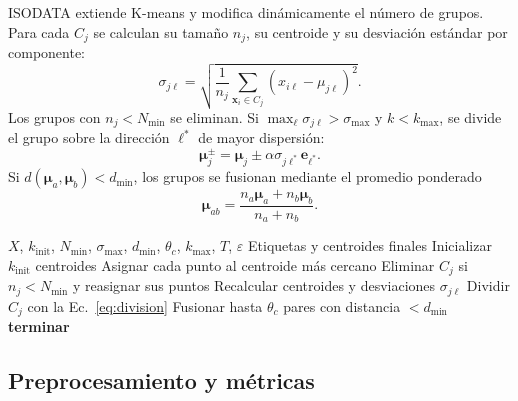 \documentclass[10pt,twocolumn]{article}
\begin{document}
ISODATA extiende K-means y modifica dinámicamente el número de grupos. Para
cada $C_j$ se calculan su tamaño $n_j$, su centroide y su desviación estándar
por componente:
\begin{equation}
 \sigma_{j\ell}=\sqrt{\frac{1}{n_j}
 \sum_{\bm{x}_i\in C_j}(x_{i\ell}-\mu_{j\ell})^2}.
 \label{eq:sigma}
\end{equation}
Los grupos con $n_j<N_{\min}$ se eliminan. Si
$\max_\ell\sigma_{j\ell}>\sigma_{\max}$ y $k<k_{\max}$, se divide el grupo
sobre la dirección $\ell^*$ de mayor dispersión:
\begin{equation}
 \bm{\mu}_{j}^{\pm}=\bm{\mu}_j
 \pm \alpha\sigma_{j\ell^*}\bm{e}_{\ell^*}.
 \label{eq:division}
\end{equation}
Si $d(\bm{\mu}_a,\bm{\mu}_b)<d_{\min}$, los grupos se fusionan mediante el
promedio ponderado
\begin{equation}
 \bm{\mu}_{ab}=\frac{n_a\bm{\mu}_a+n_b\bm{\mu}_b}{n_a+n_b}.
 \label{eq:fusion}
\end{equation}

\begin{algorithm}[H]
\small
\caption{ISODATA}
\label{alg:isodata}
\begin{algorithmic}[1]
\Require $X$, $k_{\mathrm{init}}$, $N_{\min}$, $\sigma_{\max}$,
$d_{\min}$, $\theta_c$, $k_{\max}$, $T$, $\varepsilon$
\Ensure Etiquetas y centroides finales
\State Inicializar $k_{\mathrm{init}}$ centroides
  \State Asignar cada punto al centroide más cercano
  \State Eliminar $C_j$ si $n_j<N_{\min}$ y reasignar sus puntos
  \State Recalcular centroides y desviaciones $\sigma_{j\ell}$
    \State Dividir $C_j$ con la Ec.~\eqref{eq:division}
  \Else
    \State Fusionar hasta $\theta_c$ pares con distancia $<d_{\min}$
  \EndIf
    \State \textbf{terminar}
  \EndIf
\EndFor
\end{algorithmic}
\end{algorithm}

\subsection{Preprocesamiento y métricas}
\end{document}
